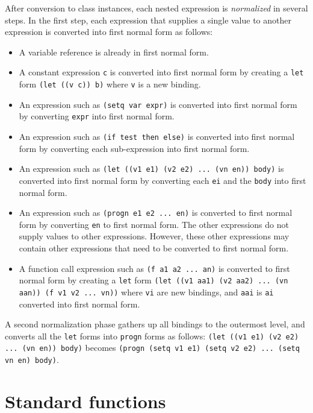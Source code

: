 \documentclass{article}
\begin{document}
After conversion to class instances, each nested expression is
\emph{normalized} in several steps.  In the first step, each
expression that supplies a single value to another expression is
converted into first normal form as follows:

\begin{itemize}
\item A variable reference is already in first normal form.
\item A constant expression \texttt{c} is converted into first normal
  form by creating a \texttt{let} form \texttt{(let ((v c)) b)} where
  \texttt{v} is a new binding. 
\item An expression such as \texttt{(setq var expr)} is converted into
  first normal form by converting \texttt{expr} into first normal
  form.
\item An expression such as \texttt{(if test then else)} is converted
  into first normal form by converting each sub-expression into first
  normal form.
\item An expression such as \texttt{(let ((v1 e1) (v2 e2) ... (vn en))
  body)} is converted into first normal form by converting each
  \texttt{ei} and the \texttt{body} into first normal form.
\item An expression such as \texttt{(progn e1 e2 ... en)} is converted
  to first normal form by converting \texttt{en} to first normal
  form.  The other expressions do not supply values to other
  expressions.  However, these other expressions may contain other
  expressions that need to be converted to first normal form.
\item A function call expression such as \texttt{(f a1 a2 ... an)} is
  converted to first normal form by creating a \texttt{let} form
  \texttt{(let ((v1 aa1) (v2 aa2) ... (vn aan)) (f v1 v2 ... vn))}
  where \texttt{vi} are new bindings, and \texttt{aai} is \texttt{ai}
  converted into first normal form.
\end{itemize}

A second normalization phase gathers up all bindings to the outermost
level, and converts all the \texttt{let} forms into \texttt{progn}
forms as follows: \texttt{(let ((v1 e1) (v2 e2) ... (vn en)) body)}
becomes \texttt{(progn (setq v1 e1) (setq v2 e2) ... (setq vn en)
  body)}.

\section{Standard functions}
\end{document}
